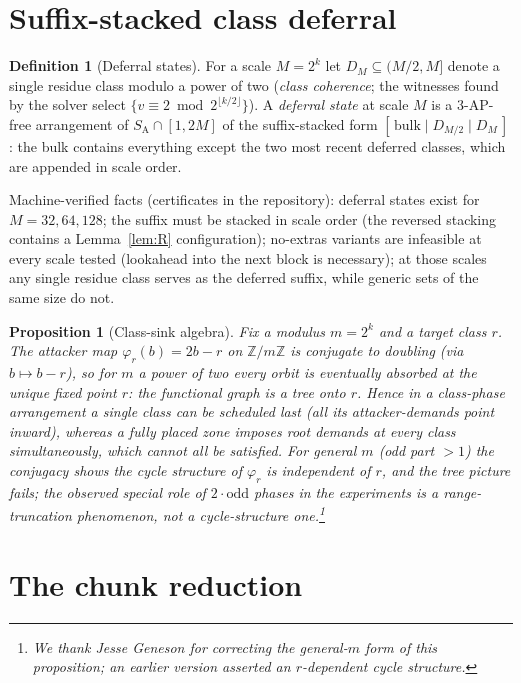 \documentclass[11pt]{article}
\newtheorem{proposition}[theorem]{Proposition}
\theoremstyle{definition}
\newtheorem{definition}[theorem]{Definition}
\newcommand{\Z}{\mathbb{Z}}
\newcommand{\SA}{S_{\mathrm{A}}}
\begin{document}
\section{Suffix-stacked class deferral}

\begin{definition}[Deferral states]
For a scale $M = 2^{k}$ let $D_M \subseteq (M/2, M]$ denote a single
residue class modulo a power of two (\emph{class coherence}; the witnesses
found by the solver select $\{v \equiv 2 \bmod 2^{\lfloor k/2 \rfloor}\}$).
A \emph{deferral state} at scale $M$ is a
$3$-AP-free arrangement of $\SA \cap [1, 2M]$ of the suffix-stacked form
$[\,\mathrm{bulk} \mid D_{M/2} \mid D_{M}\,]$: the bulk contains everything
except the two most recent deferred classes, which are appended in scale
order.
\end{definition}

Machine-verified facts (certificates in the repository): deferral states exist
for $M = 32, 64, 128$; the suffix must be stacked in scale order (the reversed
stacking contains a Lemma~\ref{lem:R} configuration); no-extras variants are
infeasible at every scale tested (lookahead into the next block is
necessary); at those scales any
single residue class serves as the deferred suffix, while generic sets of the
same size do not.

\begin{proposition}[Class-sink algebra]
Fix a modulus $m = 2^k$ and a target class $r$. The attacker map
$\varphi_r(b) = 2b - r$ on $\Z/m\Z$ is conjugate to doubling (via
$b \mapsto b - r$), so for $m$ a power of two every orbit is eventually
absorbed at the unique fixed point $r$: the functional graph is a tree onto
$r$. Hence in a class-phase arrangement a single class can be scheduled last
(all its attacker-demands point inward), whereas a fully placed zone imposes
root demands at every class simultaneously, which cannot all be satisfied.
For general $m$ (odd part $> 1$) the conjugacy shows the cycle structure of
$\varphi_r$ is independent of $r$, and the tree picture fails; the
observed special role of $2\cdot\mathrm{odd}$ phases in the experiments is a
range-truncation phenomenon, not a cycle-structure one.\footnote{We thank
Jesse Geneson for correcting the general-$m$ form of this proposition; an
earlier version asserted an $r$-dependent cycle structure.}
\end{proposition}

\section{The chunk reduction}\label{sec:chunk}
\end{document}
